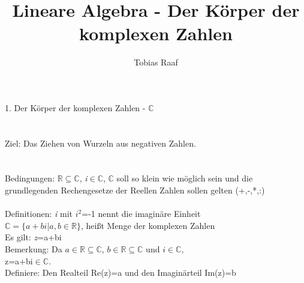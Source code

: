 \documentclass{scrartcl}
\title{Lineare Algebra - Der Körper der komplexen Zahlen}
\author{Tobias Raaf}
\begin{document}
\Large 1. Der Körper der komplexen Zahlen - $\mathbb{C}$
\\
\\
\\
\normalsize
Ziel: Das Ziehen von Wurzeln aus negativen Zahlen.
\\
\\
\\
Bedingungen: $\mathbb{R}\subseteq\mathbb{C}$, \textit{i}$\in\mathbb{C}$, $\mathbb{C}$ soll so klein wie möglich sein und die grundlegenden Rechengesetze der Reellen Zahlen sollen gelten (+,-,*,:)\\
\\
Definitionen: \textit{i} mit \textit{\(i^{2}\)}=-1 nennt die imaginäre Einheit\\
$\mathbb{C}=\{a+bi|a,b\in\mathbb{R}\}$, heißt Menge der komplexen Zahlen\\
Es gilt: \textit{z}=a+bi\\
Bemerkung: Da $a\in\mathbb{R}\subseteq\mathbb{C}$, $b\in\mathbb{R}\subseteq\mathbb{C}$ und $i\in\mathbb{C},$\\ z=a+bi$\in\mathbb{C}$.\\
Definiere: Den Realteil Re(z)=a und den Imaginärteil Im(z)=b
	
\end{document}
